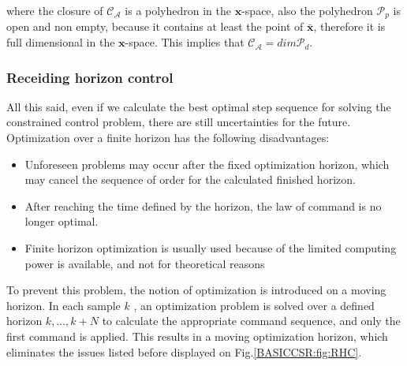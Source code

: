     where the closure of $\mathcal{C}_{\mathcal{A}}$ is a polyhedron in the $\textbf{x}$-space, also the polyhedron $\mathcal{P}_p$ is open and non empty, because it contains at least the point of $\bar{\textbf{x}}$, therefore it is full dimensional in the $\textbf{x}$-space. This implies that $\mathcal{C}_{\mathcal{A}}=dim\mathcal{P}_d$.

%
%

    \subsubsection{Receiding horizon control}\label{BASICCSR:sec:RHC}

    All this said, even if we calculate the best optimal step sequence for solving the constrained control problem, there are still uncertainties for the future. Optimization over a finite horizon has the following disadvantages:
		
		\begin{itemize}
			\item Unforeseen problems may occur after the fixed optimization horizon, which may cancel the sequence of order for the 		calculated finished horizon.
		\item After reaching the time defined by the horizon, the law of command is no longer optimal.
		\item Finite horizon optimization is usually used because of the limited computing power is available, and not for theoretical reasons
		\end{itemize}
		
		To prevent this problem, the notion of optimization is introduced on a moving horizon. In each sample $k$ , an optimization problem is solved over a defined horizon $k,\dots,k+N$ to calculate the appropriate command sequence, and only the first command is applied. This results in a moving optimization horizon, which eliminates the issues listed before displayed on Fig.\ref{BASICCSR:fig:RHC}. \\

